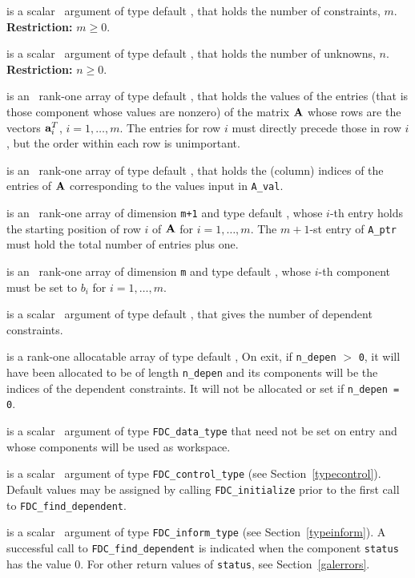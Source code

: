 \documentclass{galahad}
\newcommand{\packagename}{FDC}
\begin{document}
\begin{description}

 is a scalar \intentin\ argument of type default \integer,
that holds the number of constraints, $m$.
{\bf Restriction: } $m \geq 0$.

 is a scalar \intentin\ argument of type default \integer,
that holds the number of unknowns, $n$.
{\bf Restriction: } $n \geq 0$.

 is an \intentin\ rank-one array of type default \realdp, that holds
the values of the entries (that is those component whose values are nonzero)
of the matrix ${\mathbf{A}}$ whose rows are the vectors ${\mathbf{a}}_i^T$, $i = 1, \ldots, m$.
The entries for row $i$ must directly precede those in row $i$, but the
order within each row is unimportant.

 is an \intentin\ rank-one array of type default \integer, that 
holds the (column) indices of the entries of ${\mathbf{A}}$ corresponding to the
values input in {\tt A\_val}.

 is an \intentin\ rank-one array of dimension {\tt m+1} and type
default \integer, whose $i$-th entry holds the starting position of row $i$
of ${\mathbf{A}}$ for $i = 1, \ldots, m$. The $m+1$-st entry of {\tt A\_ptr}
must hold the total number of entries plus one.

 is an \intentin\ rank-one array of dimension {\tt m} and
type default \realdp, whose $i$-th component must be set to $b_i$ for
$i = 1, \ldots, m$.

 is a scalar \intentout\ argument of type default \integer,
that gives the number of dependent constraints.

 is a rank-one allocatable array of type default \integer,
On exit, if {\tt n\_depen} $>$ {\tt 0}, it will have been allocated to be of
length {\tt n\_depen} and its components will be the indices of the dependent
constraints. It will not be allocated or set if {\tt n\_depen = 0}.

 is a scalar \intentinout\ argument of type
{\tt \packagename\_data\_type}
that need not be set on entry and whose components will be used as workspace.

 is a scalar \intentin\ argument of type
{\tt \packagename\_control\_type}
(see Section~\ref{typecontrol}). Default values may be assigned by calling
{\tt \packagename\_initialize} prior to the first call to
{\tt \packagename\_find\_dependent}.

 is a scalar \intentinout\ argument of type
{\tt \packagename\_inform\_type}
(see Section~\ref{typeinform}). A successful call to
{\tt \packagename\_find\_dependent}
is indicated when the  component {\tt status} has the value 0.
For other return values of {\tt status}, see Section~\ref{galerrors}.

\end{description}
\end{document}
